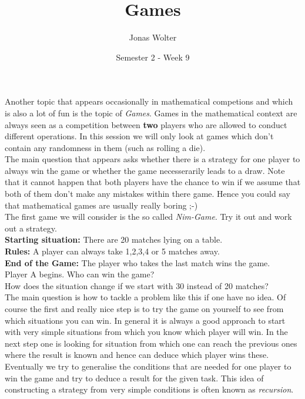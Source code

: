 \documentclass[11pt,a5paper]{article}
\title{\textbf{Games}}
\date{Semester 2 - Week 9}
\author{Jonas Wolter}
\begin{document}
\maketitle

\noindent
Another topic that appears occasionally in mathematical competions and which is also a lot of fun is the topic of \emph{Games}. 
Games in the mathematical context are always seen as a competition between \textbf{two} players who are allowed to conduct different operations. In this session we will only look at games which don't contain any randomness in them (such as rolling a die).\\
The main question that appears asks whether there is a strategy for one player to always win the game or whether the game necesserarily leads to a draw. Note that it cannot happen that both players have the chance to win if we assume that both of them don't make any mistakes within there game. Hence you could say that mathematical games are usually really boring ;-)\\

\noindent
The first game we will consider is the so called \emph{Nim-Game}. Try it out and work out a strategy.\\
\textbf{Starting situation:} There are 20 matches lying on a table.\\
\textbf{Rules:} A player can always take 1,2,3,4 or 5 matches away.\\
\textbf{End of the Game:} The player who takes the last match wins the game.\\
\noindent
Player A begins. Who can win the game?\\
\noindent 
How does the situation change if we start with 30 instead of 20 matches?\\

\noindent
The main question is how to tackle a problem like this if one have no idea. Of course the first and really nice step is to try the game on yourself to see from which situations you can win. In general it is always a good approach to start with very simple situations from which you know which player will win. In the next step one is looking for situation from which one can reach the previous ones where the result is known and hence can deduce which player wins these. Eventually we try to generalise the conditions that are needed for one player to win the game and try to deduce a result for the given task. This idea of constructing a strategy from very simple conditions is often known as \emph{recursion}.\\
\end{document}
